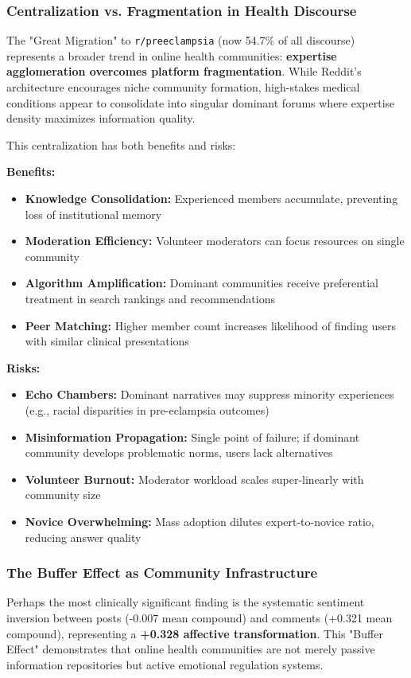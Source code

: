\documentclass[12pt, a4paper]{article}
\begin{document}
\subsubsection{Centralization vs. Fragmentation in Health Discourse}
The "Great Migration" to \texttt{r/preeclampsia} (now 54.7\% of all discourse) represents a broader trend in online health communities: \textbf{expertise agglomeration overcomes platform fragmentation}. While Reddit's architecture encourages niche community formation, high-stakes medical conditions appear to consolidate into singular dominant forums where expertise density maximizes information quality.

This centralization has both benefits and risks:

\textbf{Benefits:}
\begin{itemize}
    \item \textbf{Knowledge Consolidation:} Experienced members accumulate, preventing loss of institutional memory
    \item \textbf{Moderation Efficiency:} Volunteer moderators can focus resources on single community
    \item \textbf{Algorithm Amplification:} Dominant communities receive preferential treatment in search rankings and recommendations
    \item \textbf{Peer Matching:} Higher member count increases likelihood of finding users with similar clinical presentations
\end{itemize}

\textbf{Risks:}
\begin{itemize}
    \item \textbf{Echo Chambers:} Dominant narratives may suppress minority experiences (e.g., racial disparities in pre-eclampsia outcomes)
    \item \textbf{Misinformation Propagation:} Single point of failure; if dominant community develops problematic norms, users lack alternatives
    \item \textbf{Volunteer Burnout:} Moderator workload scales super-linearly with community size
    \item \textbf{Novice Overwhelming:} Mass adoption dilutes expert-to-novice ratio, reducing answer quality
\end{itemize}

\subsubsection{The Buffer Effect as Community Infrastructure}
Perhaps the most clinically significant finding is the systematic sentiment inversion between posts (-0.007 mean compound) and comments (+0.321 mean compound), representing a \textbf{+0.328 affective transformation}. This "Buffer Effect" demonstrates that online health communities are not merely passive information repositories but active emotional regulation systems.
\end{document}
